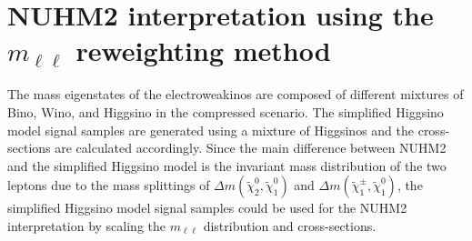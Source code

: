 

\section{NUHM2 interpretation using the $m_{\ell \ell}$ reweighting method}
\label{sec:results_mll_reweighting}
The mass eigenstates of the electroweakinos are composed of different mixtures of Bino, Wino, and Higgsino in the compressed scenario.
The simplified Higgsino model signal samples are generated using a mixture of Higgsinos and the cross-sections are calculated accordingly.
Since the main difference between NUHM2 and the simplified Higgsino model is the invariant mass distribution of the two leptons due to the mass splittings of $\Delta m(\widetilde{\chi}^{0}_{2}, \widetilde{\chi}^{0}_{1})$ and $\Delta m(\widetilde{\chi}^{\pm}_{1}, \widetilde{\chi}^{0}_{1})$, the simplified Higgsino model signal samples could be used for the NUHM2 interpretation by scaling the $m_{\ell \ell}$ distribution and cross-sections.

